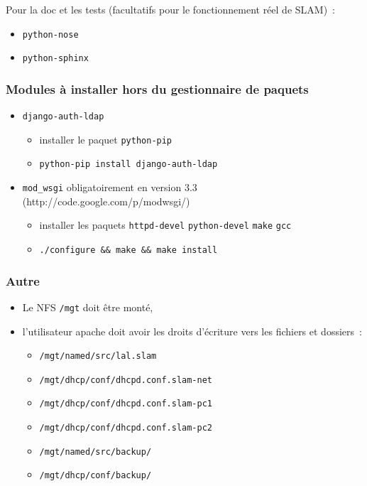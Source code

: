 \documentclass[12pt,a4paper,twoside]{report}
\begin{document}
Pour la doc et les tests (facultatifs pour le fonctionnement réel de SLAM)~:

\begin{itemize}
	\item \verb+python-nose+
	\item \verb+python-sphinx+
\end{itemize}

\subsubsection{Modules à installer hors du gestionnaire de paquets}

\begin{itemize}
	\item \verb+django-auth-ldap+
	\begin{itemize}
		\item installer le paquet \verb+python-pip+
		\item \verb+python-pip install django-auth-ldap+
	\end{itemize}
	\item \verb+mod_wsgi+ obligatoirement en version 3.3 (http://code.google.com/p/modwsgi/)
	\begin{itemize}
		\item installer les paquets \verb+httpd-devel+ \verb+python-devel+ \verb+make+ \verb+gcc+
		\item \verb+./configure && make && make install+
	\end{itemize}
\end{itemize}

\subsubsection{Autre}

\begin{itemize}
	\item Le NFS \verb+/mgt+ doit être monté,
	\item l’utilisateur apache doit avoir les droits d’écriture vers les fichiers et dossiers~:
	\begin{itemize}
		\item \verb+/mgt/named/src/lal.slam+
		\item \verb+/mgt/dhcp/conf/dhcpd.conf.slam-net+
		\item \verb+/mgt/dhcp/conf/dhcpd.conf.slam-pc1+
		\item \verb+/mgt/dhcp/conf/dhcpd.conf.slam-pc2+
		\item \verb+/mgt/named/src/backup/+
		\item \verb+/mgt/dhcp/conf/backup/+
	\end{itemize}
\end{itemize}
\end{document}
